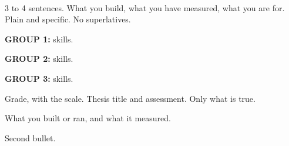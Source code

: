 \documentclass[11pt]{article}
\begin{document}

\begin{center}\small
  \cvdot
  \cvdot
  \\[3pt]
  \cvdot
\end{center}
\vspace{3pt}

{{3 to 4 sentences. What you build, what you have measured, what you are for.
  Plain and specific. No superlatives.}}

\textbf{{{GROUP 1}}:} {{skills}}.\par\vspace{2pt}
\textbf{{{GROUP 2}}:} {{skills}}.\par\vspace{2pt}
\textbf{{{GROUP 3}}:} {{skills}}.

\begin{cvitems}
  \item {{Grade, with the scale. Thesis title and assessment. Only what is true.}}
\end{cvitems}
\vspace{4pt}


\begin{cvitems}
  \item {{What you built or ran, and what it measured.}}
  \item {{Second bullet.}}
\end{cvitems}
\vspace{5pt}


\end{document}
